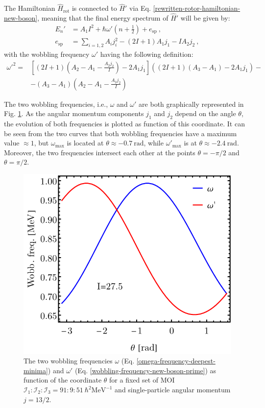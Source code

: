 The Hamiltonian $\hat{H}_\text{rot}$ is connected to $\hat{H}'$ via Eq. \ref{rewritten-rotor-hamiltonian-new-boson}, meaning that the final energy spectrum of $\hat{H}'$ will be given by:
\begin{align}
    E_n'&=A_1I^2+\hbar\omega'\left(n+\frac{1}{2}\right)+e_\text{sp}\ ,\nonumber\\
    e_\text{sp}&=\sum_{i=1,2}A_ij_i^2-(2I+1)A_1j_1-IA_2j_2\ ,
\end{align}
with the wobbling frequency $\omega'$ having the following definition:
\begin{align}
    \omega'^2=&\left[(2I+1)\left(A_2-A_1-\frac{A_2j_2}{I}\right)-2A_1j_1\right]\left((2I+1)(A_3-A_1)-2A_1j_1\right)-\nonumber\\
    &-(A_3-A_1)\left(A_2-A_1-\frac{A_2j_2}{I}\right)
    \label{wobbling-frequency-new-boson-prime}
\end{align}

The two wobbling frequencies, i.e., $\omega$ and $\omega'$ are both graphically represented in Fig. \ref{wobbling-frequencies-harmonic-approx}. As the angular momentum components $j_1$ and $j_2$ depend on the angle $\theta$, the evolution of both frequencies is plotted as function of this coordinate. It can be seen from the two curves that both wobbling frequencies have a maximum value $\approx1$, but $\omega_\text{max}$ is located at $\theta\approx-0.7\ \text{rad}$, while $\omega'_\text{max}$ is at $\theta\approx-2.4\ \text{rad}$. Moreover, the two frequencies intersect each other at the points $\theta=-\pi/2$ and $\theta=\pi/2$.
\begin{figure}
    \centering
    \includegraphics[scale=0.85]{Chapters/Figures/Wobbling-Frequencies-New-Boson.pdf}
    \caption{The two wobbling frequencies $\omega$ (Eq. \ref{omega-frequency-deepest-minima}) and $\omega'$ (Eq. \ref{wobbling-frequency-new-boson-prime}) as function of the coordinate $\theta$ for a fixed set of MOI $\mathcal{I}_1:\mathcal{I}_2:\mathcal{I}_3=91:9:51\ \hbar^2\text{MeV}^{-1}$ and single-particle angular momentum $j=13/2$.}
    \label{wobbling-frequencies-harmonic-approx}
\end{figure}

